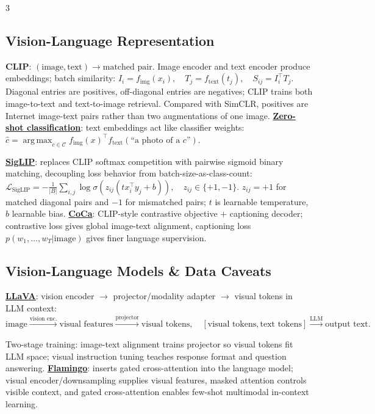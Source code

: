 \documentclass{article}
\numberwithin{equation}{subsection}
\newcommand{\key}[1]{\textbf{#1}}
\newcommand{\lowterm}[1]{\textbf{\underline{#1}}}
\DeclareMathOperator*{\argmax}{arg\,max}
\begin{document}
\begin{multicols*}{3}
\subsection{Vision-Language Representation}

\key{CLIP}: 
\(
(\text{image},\text{text})\to\text{matched pair}.
\)
Image encoder and text encoder produce embeddings; batch similarity:
\(
I_i=f_{\mathrm{img}}(x_i),\quad T_j=f_{\mathrm{text}}(t_j),\quad S_{ij}=I_i^\top T_j.
\)
Diagonal entries are positives, off-diagonal entries are negatives; CLIP trains both image-to-text and text-to-image retrieval. Compared with SimCLR, positives are Internet image-text pairs rather than two augmentations of one image. \lowterm{Zero-shot classification}: text embeddings act like classifier weights:
\(
\hat c=\argmax_{c\in\mathcal C} f_{\mathrm{img}}(x)^\top f_{\mathrm{text}}(\text{``a photo of a }c\text{''}).
\)

\lowterm{SigLIP}: replaces CLIP softmax competition with pairwise sigmoid binary matching, decoupling loss behavior from batch-size-as-class-count:
\(
\mathcal L_{\mathrm{SigLIP}}=-\frac1{|B|}\sum_{i,j}\log\sigma\!\left(z_{ij}(t x_i^\top y_j+b)\right),\quad z_{ij}\in\{+1,-1\}.
\)
$z_{ij}=+1$ for matched diagonal pairs and $-1$ for mismatched pairs; $t$ is learnable temperature, $b$ learnable bias. \lowterm{CoCa}: CLIP-style contrastive objective + captioning decoder; contrastive loss gives global image-text alignment, captioning loss $p(w_1,\ldots,w_T|\text{image})$ gives finer language supervision.


\subsection{Vision-Language Models \& Data Caveats}
 \lowterm{LLaVA}: vision encoder $\to$ projector/modality adapter $\to$ visual tokens in LLM context:
\(
\text{image}\xrightarrow{\text{vision enc.}}\text{visual features}\xrightarrow{\text{projector}}\text{visual tokens},\quad
[\text{visual tokens},\text{text tokens}]\xrightarrow{\text{LLM}}\text{output text}.
\)

Two-stage training: image-text alignment trains projector so visual tokens fit LLM space; visual instruction tuning teaches response format and question answering. \lowterm{Flamingo}: inserts gated cross-attention into the language model; visual encoder/downsampling supplies visual features, masked attention controls visible context, and gated cross-attention enables few-shot multimodal in-context learning.



\end{multicols*}
\end{document}

